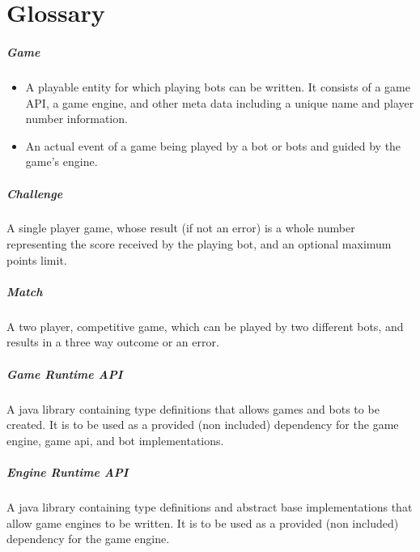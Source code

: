 
%

	\chapter*{Glossary}

	\paragraph{Game}
	\begin{itemize}
		\item A playable entity for which playing bots can be written. It consists of a game API, a game engine, and other meta data including a unique name and player number information. 
		
		\item An actual event of a game being played by a bot or bots and guided by the game's engine.
	\end{itemize}
	
	\paragraph{Challenge} A single player game, whose result (if not an error) is a whole number representing the score received by the playing bot, and an optional maximum points limit.
  
  	\paragraph{Match} A two player, competitive game, which can be played by two different bots, and results in a three way outcome or an error.
  
  	\paragraph{Game Runtime API} A java library containing type definitions that allows games and bots to be created. It is to be used as a provided (non included) dependency for the game engine, game api, and bot implementations.
  	
  	\paragraph{Engine Runtime API} A java library containing type definitions and abstract base implementations that allow game engines to be written. It is to be used as a provided (non included) dependency for the game engine.
  
